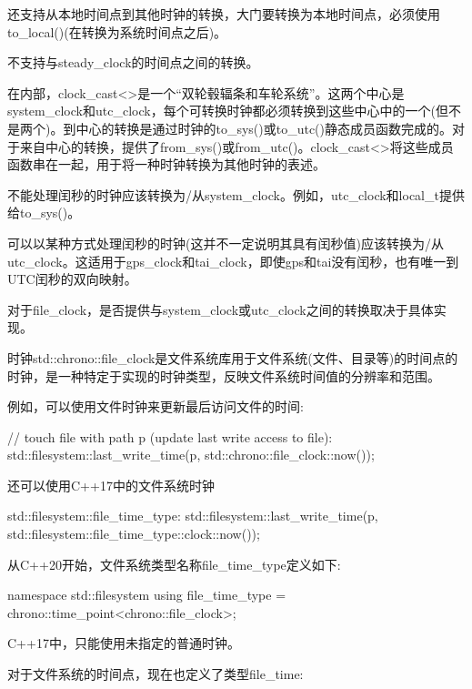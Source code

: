 还支持从本地时间点到其他时钟的转换，大门要转换为本地时间点，必须使用to\_local()(在转换为系统时间点之后)。

不支持与steady\_clock的时间点之间的转换。


在内部，clock\_cast<>是一个“双轮毂辐条和车轮系统”。这两个中心是system\_clock和utc\_clock，每个可转换时钟都必须转换到这些中心中的一个(但不是两个)。到中心的转换是通过时钟的to\_sys()或to\_utc()静态成员函数完成的。对于来自中心的转换，提供了from\_sys()或from\_utc()。clock\_cast<>将这些成员函数串在一起，用于将一种时钟转换为其他时钟的表述。

不能处理闰秒的时钟应该转换为/从system\_clock。例如，utc\_clock和local\_t提供给to\_sys()。

可以以某种方式处理闰秒的时钟(这并不一定说明其具有闰秒值)应该转换为/从utc\_clock。这适用于gps\_clock和tai\_clock，即使gps和tai没有闰秒，也有唯一到UTC闰秒的双向映射。

对于file\_clock，是否提供与system\_clock或utc\_clock之间的转换取决于具体实现。



时钟std::chrono::file\_clock是文件系统库用于文件系统(文件、目录等)的时间点的时钟，是一种特定于实现的时钟类型，反映文件系统时间值的分辨率和范围。

例如，可以使用文件时钟来更新最后访问文件的时间:

\begin{cpp}
// touch file with path p (update last write access to file):
std::filesystem::last_write_time(p,
								 std::chrono::file_clock::now());
\end{cpp}

还可以使用C++17中的文件系统时钟

\begin{cpp}
std::filesystem::file_time_type:
	std::filesystem::last_write_time(p,
									std::filesystem::file_time_type::clock::now());
\end{cpp}

从C++20开始，文件系统类型名称file\_time\_type定义如下:

\begin{cpp}
namespace std::filesystem {
	using file_time_type = chrono::time_point<chrono::file_clock>;
}
\end{cpp}

C++17中，只能使用未指定的普通时钟。

对于文件系统的时间点，现在也定义了类型file\_time:

